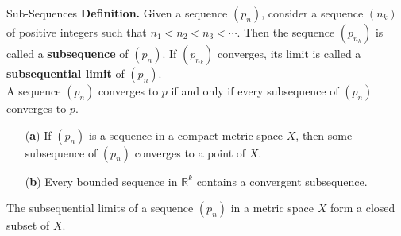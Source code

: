 \documentclass{beamer}
\begin{document}
\begin{frame}{Sub-Sequences}
\textbf{Definition.} Given a sequence $(p_n)$, consider a sequence $(n_k)$ of
positive integers such that $n_1 < n_2 < n_3 < \cdots$. Then the sequence
$(p_{n_k})$ is called a \textbf{subsequence} of $(p_n)$. If $(p_{n_k})$
converges, its limit is called a \textbf{subsequential limit} of $(p_n)$. \\ 

A sequence $(p_n)$ converges to $p$ if and only if every subsequence of $(p_n)$
converges to $p$.

\begin{theorem}
\begin{enumerate}
    \item[(\textbf{a})] If $(p_n)$ is a sequence in a compact metric space $X$,
    then some subsequence of $(p_n)$ converges to a point of $X$.
    \item[(\textbf{b})] Every bounded sequence in $\mathbb{R}^k$ contains a
    convergent subsequence.
\end{enumerate}
\end{theorem}

\begin{theorem}
The subsequential limits of a sequence $(p_n)$ in a metric space $X$ form a
closed subset of $X$.
\end{theorem}
\end{frame}
\end{document}
